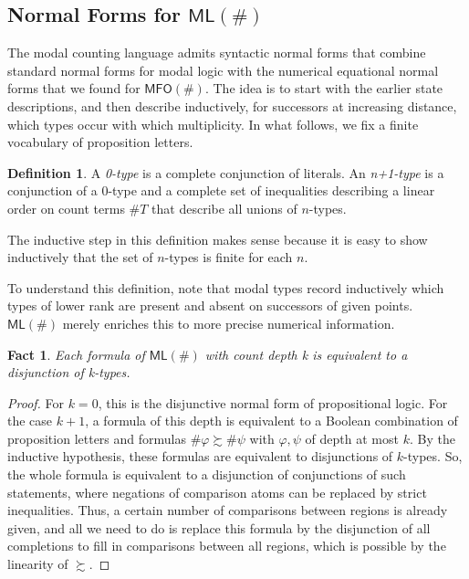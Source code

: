 \documentclass[12pt,oneside,reqno]{amsart}
\newtheorem{fact}{Fact}
\theoremstyle{definition}
\newtheorem{definition}{Definition}
\begin{document}
\subsection{Normal Forms for $\mathsf{ML}(\#)$}  The modal counting language admits syntactic normal forms that combine standard normal forms for modal logic with the numerical equational normal forms that we found   for $\mathsf{MFO(\#)}$. The idea is to start with the earlier state descriptions, and then describe inductively, for successors at increasing distance, which types occur with which multiplicity. In what follows, we fix a finite vocabulary of proposition letters.

\begin{definition} A \emph{0-type} is a complete conjunction of literals. An \emph{n+1-type} is a conjunction of a 0-type and a complete set of inequalities describing a linear order on count terms   $\#T$ that describe all unions of $n$-types.
\end{definition}

The inductive step in this definition makes sense because it is easy to show inductively that the set of $n$-types is finite for each $n$. 

To understand this definition, note that  modal types record inductively which types of lower rank are present and absent   on successors of given points. $\mathsf{ML}(\#)$ merely enriches this  to more precise numerical information.
\vspace{0.5ex}
\begin{fact}
Each formula of $\mathsf{ML}(\#)$ with count depth k is equivalent to a  disjunction of k-types. \vspace{0.2ex}
\end{fact}


\begin{proof}
For $k = 0$, this is the  disjunctive normal form of propositional logic. For the case $k+1$, a formula of this depth is equivalent to a Boolean combination of proposition letters and formulas $\# \varphi \succsim \# \psi$ with $\varphi,\psi$ of depth at most $k$. By the inductive hypothesis,  these formulas are equivalent to disjunctions of $k$-types. So, the whole formula is equivalent to a disjunction of conjunctions of such statements, where negations of comparison atoms can be replaced by strict inequalities.  Thus, a certain number of comparisons between regions is already given, and all we need to do is replace this formula by the disjunction of all completions to fill in comparisons between all regions, which is possible by  the linearity of $\succsim$.
\end{proof}
\end{document}
